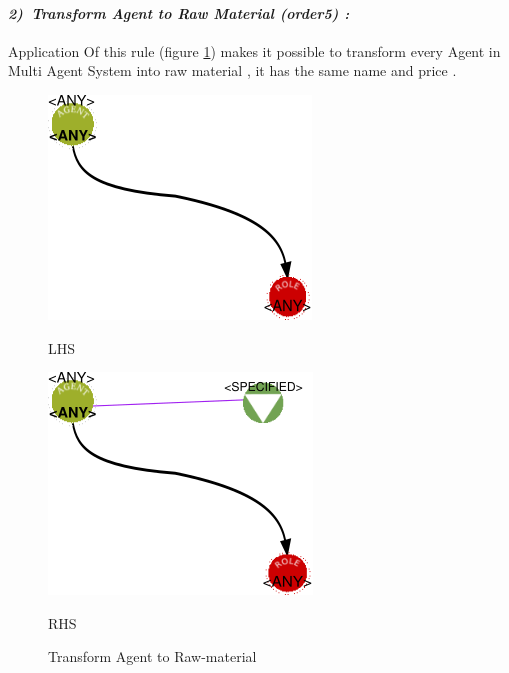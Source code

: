 \paragraph{\emph{2)~Transform Agent to Raw Material (order5) :} }
 
 
Application Of this rule (figure \ref{fig:Generate for each agent raw material}) 
makes it possible to transform  every Agent in Multi Agent System into raw material , it has the same name and price  .
\vspace{1cm}
\begin{figure}[th]
\centering
\begin{minipage}{.6\textwidth}
	\includegraphics[width=.7\linewidth]{Chapiter3/img/L2}
	\linebreak  
	
	\hspace{2.5cm}  LHS 
\end{minipage}%
\begin{minipage}{.6\textwidth}
  \includegraphics[width=.7\linewidth]{Chapiter3/img/R2}
  \linebreak  

  \hspace{2.5cm}  RHS 
\end{minipage}
\caption{\label{fig:Generate for each agent raw material}Transform Agent to Raw-material} 
\end{figure}
\vspace{1cm}

